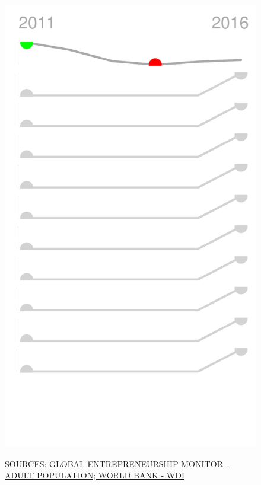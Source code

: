 \documentclass{article}\usepackage[]{graphicx}\usepackage[]{color}
\makeatletter
\def\maxwidth{ %
  \ifdim\Gin@nat@width>\linewidth
    \linewidth
  \else
    \Gin@nat@width
  \fi
}
\makeatother
\begin{document}
\begin{figure}
\begin{minipage}[c]{0.95\textwidth}
\begin{minipage}[c]{0.125\textwidth}
{\centering \includegraphics[width=\maxwidth]{figure/sparklines_Culture-1} 

}



    \vspace*{-0.5cm}
  \end{minipage}
  
  \vspace{-1ex}
  \scriptsize{\href{http://www.gemconsortium.org/data/sets}{\textcolor[HTML]{22A6F5}{SOURCES: GLOBAL ENTREPRENEURSHIP MONITOR - ADULT POPULATION; }}\href{http://data.worldbank.org}{\textcolor[HTML]{22A6F5}{WORLD BANK - WDI}}}
  

\end{minipage}
\end{figure}
\end{document}
